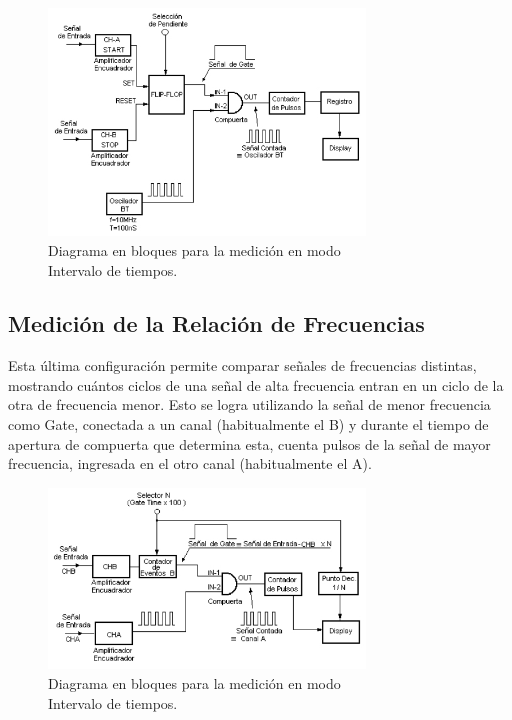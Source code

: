 \documentclass{article}
\begin{document}
\newpage
\begin{figure}[h]
	\centering
	\includegraphics[width=0.75\textwidth]{images/05-diagrama-en-bloques-modo-intervalo-tiempos.jpg}
	\medskip
	\caption{Diagrama en bloques para la medición en modo\\ Intervalo de tiempos.}
\end{figure}
\bigskip\bigskip

	
	
\subsection{Medición de la Relación de Frecuencias} 
\medskip

	Esta última configuración permite comparar señales de frecuencias distintas, mostrando cuántos ciclos de una señal de alta frecuencia entran en un ciclo de la otra de frecuencia menor. Esto se logra utilizando la señal de menor frecuencia como Gate, conectada a un canal (habitualmente el B) y durante el tiempo de apertura de compuerta que determina esta, cuenta pulsos de la señal de mayor frecuencia, ingresada en el otro canal (habitualmente el A).
\bigskip\bigskip


\begin{figure}[h]
	\centering
	\includegraphics[width=0.75\textwidth]{images/06-diagrama-en-bloques-modo-relacion-frecuencias.jpg}
	\medskip
	\caption{Diagrama en bloques para la medición en modo\\ Intervalo de tiempos.}
\end{figure}
\bigskip\bigskip
\end{document}
